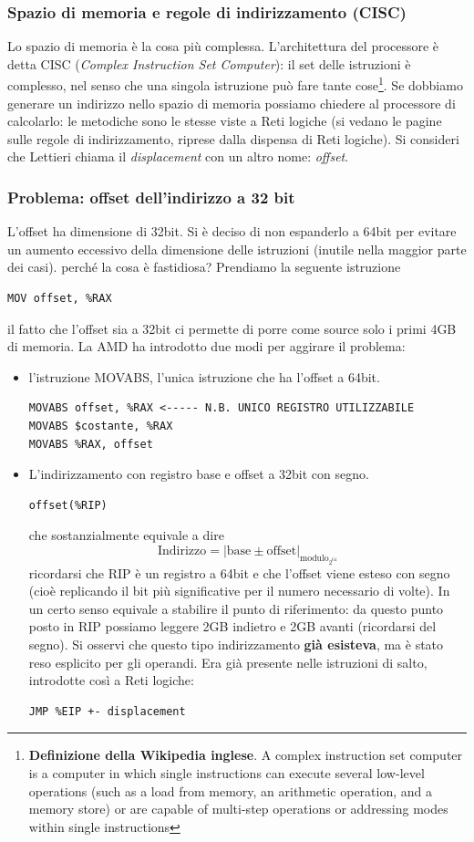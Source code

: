 \documentclass[11pt]{report}
\theoremstyle{definition}
\begin{document}
\subsubsection{Spazio di memoria e regole di indirizzamento (CISC)}
Lo spazio di memoria è la cosa più complessa. L'architettura del processore è detta CISC (\emph{Complex Instruction Set Computer}): il set delle istruzioni è complesso, nel senso che una singola istruzione può fare tante cose\footnote{\textbf{Definizione della Wikipedia inglese}. A complex instruction set computer is a computer in which single instructions can execute several low-level operations (such as a load from memory, an arithmetic operation, and a memory store) or are capable of multi-step operations or addressing modes within single instructions}. Se dobbiamo generare un indirizzo nello spazio di memoria possiamo chiedere al processore di calcolarlo: le metodiche sono le stesse viste a Reti logiche (si vedano le pagine sulle regole di indirizzamento, riprese dalla dispensa di Reti logiche). Si consideri che Lettieri chiama il \emph{displacement} con un altro nome: \emph{offset}.

\subsubsection{Problema: offset dell'indirizzo a 32 bit} L'offset ha dimensione di 32bit. Si è deciso di non espanderlo a 64bit per evitare un aumento eccessivo della dimensione delle istruzioni (inutile nella maggior parte dei casi). perché la cosa è fastidiosa? Prendiamo la seguente istruzione
\begin{verbatim}
MOV offset, %RAX
\end{verbatim}
il fatto che l'offset sia a 32bit ci permette di porre come source solo i primi 4GB di memoria. La AMD ha introdotto due modi per aggirare il problema:
\begin{itemize}
\item l'istruzione MOVABS, l'unica istruzione che ha l'offset a 64bit.
\begin{verbatim}
MOVABS offset, %RAX <----- N.B. UNICO REGISTRO UTILIZZABILE
MOVABS $costante, %RAX
MOVABS %RAX, offset
\end{verbatim}
\item L'indirizzamento con registro base e offset a 32bit con segno.
\begin{verbatim}
offset(%RIP)
\end{verbatim}
che sostanzialmente equivale a dire 
\[\text{Indirizzo}=\left|\text{base} \pm \text{offset}\right|_{\text{modulo}_{2^{64}}}\]
ricordarsi che RIP è un registro a 64bit e che l'offset viene esteso con segno (cioè replicando il bit più significative per il numero necessario di volte). In un certo senso equivale a stabilire il punto di riferimento: da questo punto posto in RIP possiamo leggere 2GB indietro e 2GB avanti (ricordarsi del segno). Si osservi che questo tipo indirizzamento \textbf{già esisteva}, ma è stato reso esplicito per gli operandi. Era già presente nelle istruzioni di salto, introdotte così a Reti logiche:
\begin{verbatim}
JMP %EIP +- displacement
\end{verbatim}
\end{itemize}
\end{document}
